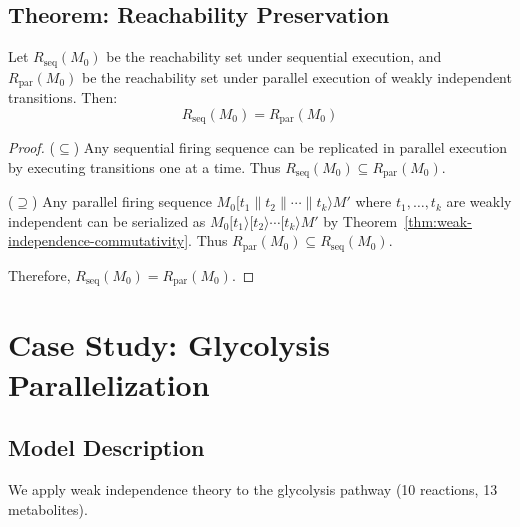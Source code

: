 \subsection{Theorem: Reachability Preservation}
\label{subsec:reachability-theorem}

\begin{theorem}
\label{thm:reachability-preservation}
Let $R_{\text{seq}}(M_0)$ be the reachability set under sequential execution, and $R_{\text{par}}(M_0)$ be the reachability set under parallel execution of weakly independent transitions. Then:
\begin{equation}
R_{\text{seq}}(M_0) = R_{\text{par}}(M_0)
\end{equation}
\end{theorem}

\begin{proof}
($\subseteq$) Any sequential firing sequence can be replicated in parallel execution by executing transitions one at a time. Thus $R_{\text{seq}}(M_0) \subseteq R_{\text{par}}(M_0)$.

($\supseteq$) Any parallel firing sequence $M_0[t_1 \parallel t_2 \parallel \cdots \parallel t_k\rangle M'$ where $t_1, \ldots, t_k$ are weakly independent can be serialized as $M_0[t_1\rangle[t_2\rangle \cdots [t_k\rangle M'$ by Theorem~\ref{thm:weak-independence-commutativity}. Thus $R_{\text{par}}(M_0) \subseteq R_{\text{seq}}(M_0)$.

Therefore, $R_{\text{seq}}(M_0) = R_{\text{par}}(M_0)$.
\end{proof}

\section{Case Study: Glycolysis Parallelization}
\label{sec:glycolysis-case-study}

\subsection{Model Description}
\label{subsec:glycolysis-model}

We apply weak independence theory to the glycolysis pathway (10 reactions, 13 metabolites).

